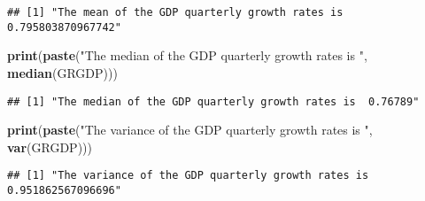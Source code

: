 \documentclass[]{article}
\newenvironment{Shaded}{\begin{snugshade}}{\end{snugshade}}
\newcommand{\KeywordTok}[1]{\textcolor[rgb]{0.13,0.29,0.53}{\textbf{#1}}}
\newcommand{\DataTypeTok}[1]{\textcolor[rgb]{0.13,0.29,0.53}{#1}}
\newcommand{\StringTok}[1]{\textcolor[rgb]{0.31,0.60,0.02}{#1}}
\newcommand{\CommentTok}[1]{\textcolor[rgb]{0.56,0.35,0.01}{\textit{#1}}}
\newcommand{\OtherTok}[1]{\textcolor[rgb]{0.56,0.35,0.01}{#1}}
\newcommand{\NormalTok}[1]{#1}
\begin{document}
\begin{Shaded}
\end{Shaded}

\begin{verbatim}
## [1] "The mean of the GDP quarterly growth rates is  0.795803870967742"
\end{verbatim}

\begin{Shaded}
\begin{Highlighting}[]
\KeywordTok{print}\NormalTok{(}\KeywordTok{paste}\NormalTok{(}\StringTok{"The median of the GDP quarterly growth rates is "}\NormalTok{, }\KeywordTok{median}\NormalTok{(GRGDP)))}
\end{Highlighting}
\end{Shaded}

\begin{verbatim}
## [1] "The median of the GDP quarterly growth rates is  0.76789"
\end{verbatim}

\begin{Shaded}
\begin{Highlighting}[]
\KeywordTok{print}\NormalTok{(}\KeywordTok{paste}\NormalTok{(}\StringTok{"The variance of the GDP quarterly growth rates is "}\NormalTok{, }\KeywordTok{var}\NormalTok{(GRGDP)))}
\end{Highlighting}
\end{Shaded}

\begin{verbatim}
## [1] "The variance of the GDP quarterly growth rates is  0.951862567096696"
\end{verbatim}
\end{document}
